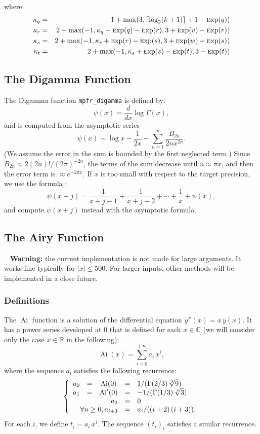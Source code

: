 \documentclass[12pt]{amsart}
\DeclareMathOperator{\Ai}{Ai}
\def\Exp{{\rm \textsc exp}}
\def\R{{\mathbb R}}
\def\C{{\mathbb C}}
\begin{document}
where 
\begin{eqnarray*}
\kappa_q & = & 1 + {\rm max}(3, \lceil\log_2(k+1)\rceil + 1 - \Exp(q))\\
\kappa_r & = & 2 + {\rm max}(-1, \kappa_q + \Exp(q) - \Exp(r),
3 + \Exp(v) - \Exp(r))\\
\kappa_s & = & 2 + {\rm max}(-1, \kappa_r + \Exp(r) - \Exp(s),
3 + \Exp(w) - \Exp(s))\\
\kappa_t & = & 2 + {\rm max}(-1, \kappa_s + \Exp(s) - \Exp(t),
3 - \Exp(t))
\end{eqnarray*}

\subsection{The Digamma Function}

The Digamma function \texttt{mpfr\_digamma} is defined by:
\[ \psi(x) = \frac{d}{dx} \log\Gamma(x), \]
and is computed from the asymptotic series \cite{Smith01}
\[ \psi(x) \sim \log x - \frac{1}{2x} - \sum_{n=1}^{\infty}
   \frac{B_{2n}}{2n x^{2n}}. \]
(We assume the error in the sum is bounded by the first neglected term.)
Since $B_{2n} \approx 2 (2n)!/(2\pi)^{-2n}$, the terms of the sum decrease
until $n \approx \pi x$, and then the error term is $\approx e^{-2\pi x}$.
If $x$ is too small with respect to the target precision, we use the formula
\cite{Smith01}:
\[ \psi(x+j) = \frac{1}{x+j-1} + \frac{1}{x+j-2} + \cdots + \frac{1}{x} +
\psi(x), \]
and compute $\psi(x+j)$ instead with the asymptotic formula.

\subsection{The Airy Function}
~\newline
\textbf{Warning:} the current implementation is not made for large arguments. It works fine typically for $|x| \le 500$. For larger inputs, other methods will be implemented in a close future.

\subsubsection{Definitions}
The $\Ai$ function is a solution of the differential equation $y''(x) = x\,y(x)$. It has a power series developed at $0$ that is defined for each $x \in \C$ (we will consider only the case $x \in \R$ in the following):
\begin{equation}
  \label{defAi}
  \Ai(x) = \sum_{i=0}^{+\infty} a_i\,x^i,
\end{equation}
where the sequence $a_i$ satisfies the following recurrence:
     $$\left\{ \begin{array}{ccccl}
         a_0 & = & \Ai(0) & = & 1/ ( \Gamma(2/3)\,\sqrt[3]{9} )\\
         a_1 & = & \Ai'(0)& = &-1/ (\Gamma(1/3)\,\sqrt[3]{3})\\
         \multicolumn{3}{r}{a_2} & = & 0\\
         \multicolumn{3}{r}{\forall n\ge0, a_{i+3}}& = & a_i / ((i+2)\,(i+3)).
       \end{array}
       \right.
       $$
For each $i$, we define $t_i = a_i\,x^i$. The sequence $(t_i)_i$ satisfies a similar recurrence.
\end{document}

